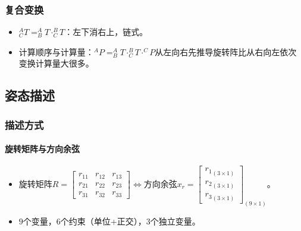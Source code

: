 \documentclass[
12pt, %
a4paper, 
oneside, %
headinclude,footinclude, %
]{scrartcl}
\begin{document}
\subsubsection[复合变换]{复合变换}
\begin{itemize}
\item $ ^A_C T = ^A_B T \cdot ^B_C T $：左下消右上，链式。
\item 计算顺序与计算量：$ ^A P = ^A_B T \cdot ^B_C T \cdot ^C P $从左向右先推导旋转阵比从右向左依次变换计算量大很多。
\end{itemize}
\subsection[姿态描述]{姿态描述}
\subsubsection[描述方式]{描述方式}
\paragraph{旋转矩阵与方向余弦}
\begin{itemize}
\item 旋转矩阵$ R = \begin{bmatrix} r_{11} & r_{12} & r_{13} \\ r_{21} & r_{22} & r_{23} \\ r_{31} & r_{32} & r_{33} \end{bmatrix} $$ \Leftrightarrow $方向余弦$ x_r = \begin{bmatrix} {r_1}_{(3 \times 1)} \\ {r_2}_{(3 \times 1)} \\ {r_3}_{(3 \times 1)} \end{bmatrix}_{(9 \times 1)} $。
\item $ 9 $个变量，$ 6 $个约束（单位+正交），$ 3 $个独立变量。
\end{itemize}
\end{document}
